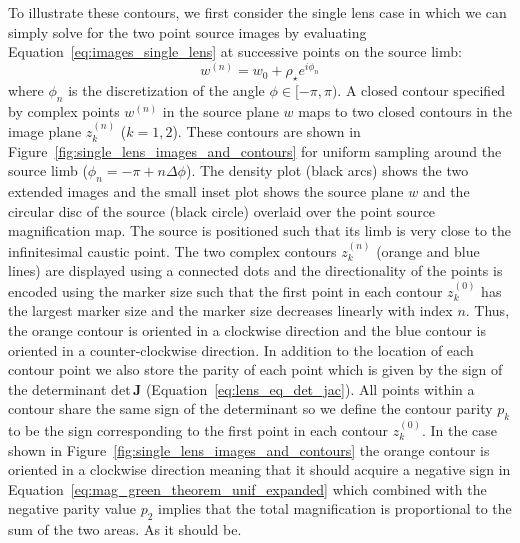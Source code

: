 \documentclass[12pt,dvipsnames]{report}
\renewcommand{\vec}[1]{\boldsymbol{\mathbf{#1}}}
\begin{document}
To illustrate these contours, we first consider the single lens case in which we can 
simply solve for the two point source images by evaluating 
Equation~\ref{eq:images_single_lens} at successive points on the source limb: 
\begin{equation}
    w^{(n)}=w_0 + \rho_\star e^{i\phi_n}
\end{equation}
where $\phi_n$ is the discretization of the angle $\phi\in[-\pi,\pi)$. 
A closed contour specified by complex points $w^{(n)}$ in the
source plane $w$ maps to two closed contours in the image plane $z^{(n)}_k$ ($k=1,2$).
These contours are shown in Figure~\ref{fig:single_lens_images_and_contours} for 
uniform sampling around the source limb ($\phi_n=-\pi+n\Delta\phi$).
The density plot (black arcs) shows the two extended images and the small inset plot shows 
the source plane $w$ and the circular disc of the source (black circle) overlaid over the 
point source magnification map. The source is positioned such that its limb is very close 
to the infinitesimal caustic point. The two complex contours $z^{(n)}_k$ (orange and 
blue lines) are displayed using a connected dots and the directionality of the points
is encoded using the marker size such that the first point in each contour $z^{(0)}_k$ 
has the largest marker size and the marker size decreases linearly with index $n$. 
Thus, the orange contour is oriented in a clockwise direction and the blue contour 
is oriented in a counter-clockwise direction. In addition to the location of each contour 
point we also store the parity of each point which is given by the sign of the determinant 
$\mathrm{det}\,\vec J$ (Equation~\ref{eq:lens_eq_det_jac}). All points within a contour 
share the same sign of the determinant so we define the contour parity $p_k$ to be 
the sign corresponding to the first point in each contour $z^{(0)}_k$. In the case shown in
Figure~\ref{fig:single_lens_images_and_contours} the orange contour is oriented in a clockwise
direction meaning that it should acquire a negative sign in 
Equation~\ref{eq:mag_green_theorem_unif_expanded} which combined with the negative parity
value $p_2$ implies that the total magnification is proportional to the sum of the two 
areas. As it should be.
\end{document}

